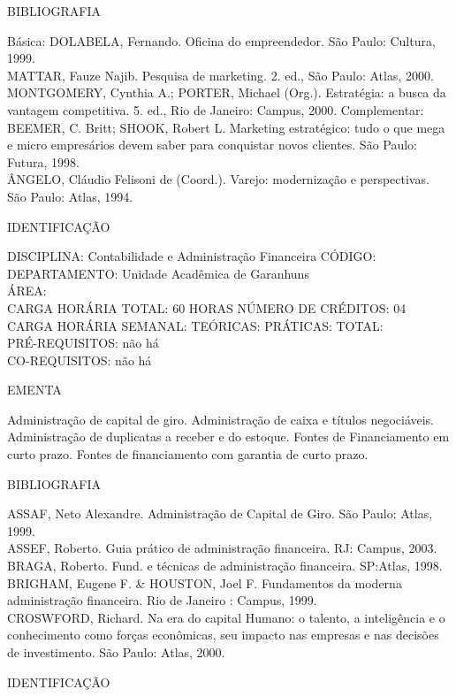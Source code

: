 \documentclass[
	12pt,				%
	openright,			%
  oneside,     %
	a4paper,			%
	english,			%
	french,				%
	spanish,			%
	brazil				%
	]{abntex2}
\begin{document}
\begin{apendicesenv}
BIBLIOGRAFIA 

Básica:
DOLABELA, Fernando. Oficina do empreendedor. São Paulo: Cultura, 1999.\\
MATTAR, Fauze Najib. Pesquisa de marketing. 2. ed., São Paulo: Atlas,
2000.\\
MONTGOMERY, Cynthia A.; PORTER, Michael (Org.). Estratégia: a busca da
vantagem competitiva. 5. ed., Rio de Janeiro: Campus, 2000.
Complementar:\\
BEEMER, C. Britt; SHOOK, Robert L. Marketing estratégico: tudo o que
mega e micro empresários devem saber para conquistar novos clientes.
São Paulo: Futura, 1998.\\
ÂNGELO, Cláudio Felisoni de (Coord.). Varejo: modernização e
perspectivas. São Paulo: Atlas, 1994.

\newpage IDENTIFICAÇÃO

DISCIPLINA: Contabilidade e Administração Financeira CÓDIGO:\\ 
DEPARTAMENTO: Unidade Acadêmica de Garanhuns\\
ÁREA: \\
CARGA HORÁRIA TOTAL: 60 HORAS NÚMERO DE CRÉDITOS: 04\\
CARGA HORÁRIA SEMANAL: TEÓRICAS: PRÁTICAS: TOTAL: \\
PRÉ-REQUISITOS: não há\\
CO-REQUISITOS: não há

EMENTA 

Administração de capital de giro. Administração de caixa e títulos
negociáveis. Administração de duplicatas a receber e do estoque. Fontes
de Financiamento em curto prazo. Fontes de financiamento com garantia
de curto prazo.

BIBLIOGRAFIA 

ASSAF, Neto Alexandre. Administração de Capital de Giro. São Paulo:
Atlas, 1999.\\
ASSEF, Roberto. Guia prático de administração financeira. RJ: Campus,
2003.\\
BRAGA, Roberto. Fund. e técnicas de administração financeira. SP:Atlas,
1998.\\
BRIGHAM, Eugene F. \& HOUSTON, Joel F. Fundamentos da moderna
administração financeira. Rio de Janeiro : Campus, 1999.\\
CROSWFORD, Richard. Na era do capital Humano: o talento, a inteligência
e o conhecimento como forças econômicas, seu impacto nas empresas e nas
decisões de investimento. São Paulo: Atlas, 2000.

\newpage IDENTIFICAÇÃO


\end{apendicesenv}
\end{document}
